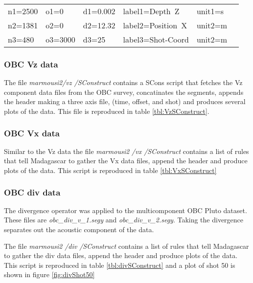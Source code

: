 {
\begin{tabular}[t]{|llllll|}
        \hline
        n1=2500    &   o1=0     &   d1=0.002    &    label1=Depth\ Z     &  unit1=s  &  \\
        n2=1381    &   o2=0     &   d2=12.32    &    label2=Position\ X  &  unit2=m  &  \\
	n3=480 	   &   o3=3000  &   d3=25	&    label3=Shot-Coord   &  unit2=m  &  \\
        \hline
\end{tabular}
}


\subsubsection{OBC Vz data}
The file \emph{marmousi2\slash vz \slash SConstruct} contains a SCons script that fetches the Vz component
data files from the OBC survey, concatinates the segments, appends the header making a 
three axis file, (time, offset, and shot) and produces several plots of the data.  This file is reproduced in table 
\ref{tbl:VzSConstruct}.  

{
\tiny

\normalsize
}

\subsubsection{OBC Vx data}
Similar to the Vz data the file \emph{marmousi2 \slash vx \slash SConstruct} contains a list of rules that tell
Madagascar to gather the Vx data files, append the header and produce plots of the data.  This script is reproduced 
in table \ref{tbl:VxSConstruct}
{
\tiny

\normalsize
}


\subsubsection{OBC div data}
The divergence operator was applied to the multicomponent OBC Pluto dataset.  These files are \emph{obc\_div\_v\_1.segy} and 
\emph{obc\_div\_v\_2.segy}.  Taking the divergence separates out the acoustic component of the data.    

The file \emph{marmousi2 \slash div \slash SConstruct} contains a list of rules that tell Madagascar to gather the 
div data files, append the header and produce plots of the data.  This script is reproduced 
in table \ref{tbl:divSConstruct} and a plot of shot 50 is shown in figure \ref{fig:divShot50}

